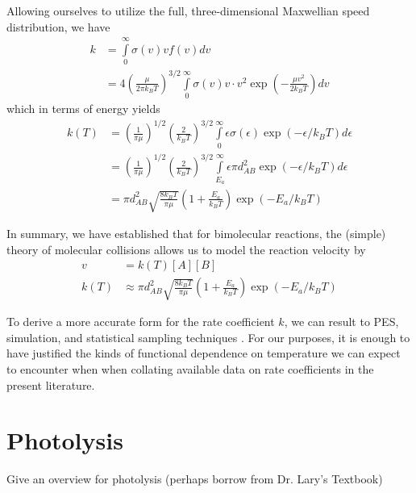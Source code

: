 Allowing ourselves to utilize the full, three-dimensional Maxwellian speed distribution, we have
\begin{equation}
  \begin{aligned}
  k &= \int\limits_0^\infty \sigma(v)v f(v) dv \\
  &= 4\left(\frac{\mu}{2\pi k_BT} \right)^{3/2}\int\limits_0^\infty \sigma(v)v \cdot v^2\exp\left(-\frac{\mu v^2}{2k_BT} \right)dv
  \end{aligned}
\end{equation}
which in terms of energy yields
\begin{equation}
  \begin{aligned}
  k(T) &= \left(\frac{1}{\pi \mu} \right)^{1/2}\left(\frac{2}{k_BT}\right)^{3/2}\int\limits_{0}^{\infty}\epsilon\sigma(\epsilon)\exp(-\epsilon/k_BT)d\epsilon \\
  &= \left(\frac{1}{\pi \mu} \right)^{1/2}\left(\frac{2}{k_BT}\right)^{3/2}\int\limits_{E_a}^{\infty}\epsilon\pi d_{AB}^2\exp(-\epsilon/k_BT)d\epsilon \\
  &= \pi d_{AB}^2 \sqrt{\frac{8k_BT}{\pi \mu}}\left(1 + \frac{E_a}{k_BT} \right)\exp(-E_a/k_BT)
  \end{aligned}
\end{equation}

In summary, we have established that for bimolecular reactions, the (simple) theory of molecular collisions allows us to model the reaction velocity by
\begin{align}
  v &= k(T)[A][B] \\
  k(T) &\approx \pi d_{AB}^2 \sqrt{\frac{8k_BT}{\pi \mu}}\left(1 + \frac{E_a}{k_BT}\right)\exp(-E_a/k_BT)
\end{align}

To derive a more accurate form for the rate coefficient $k$, we can result to PES, simulation, and statistical sampling techniques \cite[for example]{pes-h-h2, pes-for-k}. For our purposes, it is enough to have justified the kinds of functional dependence on temperature we can expect to encounter when when collating available data on rate coefficients in the present literature.




\section{Photolysis}

Give an overview for photolysis (perhaps borrow from Dr. Lary's Textbook)

